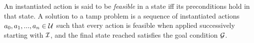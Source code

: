 An instantiated action is said to be \emph{feasible} in a state iff
its preconditions hold in that state. A solution to a {\sc
  tamp} problem is a sequence of instantiated actions $a_{0}, a_{1},
..., a_{n} \in \mathcal{U}$ such that every action is feasible when applied
successively starting with $\mathcal{I}$, and the final state reached satisfies the
goal condition $\mathcal{G}$.






